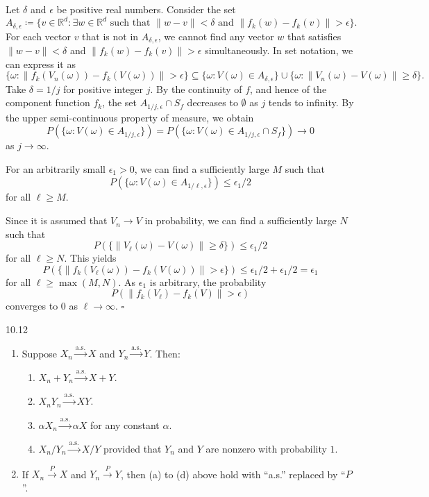 Let $\delta$ and $\epsilon$ be positive real numbers. Consider the set
\[
A_{\delta,\epsilon}\coloneqq
\{v\in\mathbb{R}^d:\exists w\in\mathbb{R}^d
\text{ such that }\lVert w-v\rVert<\delta
\text{ and }
\lVert f_k(w)-f_k(v)\rVert>\epsilon\}.
\]
For each vector $v$ that is not in $A_{\delta,\epsilon}$, we cannot find any vector $w$ that satisfies $\lVert w-v\rVert<\delta$ and $\lVert f_k(w)-f_k(v)\rVert>\epsilon$ simultaneously. In set notation, we can express it as
\[
\{\omega:\lVert f_k(V_n(\omega))-f_k(V(\omega))\rVert>\epsilon\}
\subseteq
\{\omega:V(\omega)\in A_{\delta,\epsilon}\}
\cup
\{\omega:\lVert V_n(\omega)-V(\omega)\rVert\geq\delta\}.
\]
Take $\delta=1/j$ for positive integer $j$. By the continuity of $f$, and hence of the component function $f_k$, the set $A_{1/j,\epsilon}\cap S_f$ decreases to $\emptyset$ as $j$ tends to infinity. By the upper semi-continuous property of measure, we obtain
\[
P(\{\omega:V(\omega)\in A_{1/j,\epsilon}\})
=
P(\{\omega:V(\omega)\in A_{1/j,\epsilon}\cap S_f\})
\to 0
\]
as $j\to\infty$.

For an arbitrarily small $\epsilon_1>0$, we can find a sufficiently large $M$ such that
\[
P(\{\omega:V(\omega)\in A_{1/\ell,\epsilon}\})\leq \epsilon_1/2
\]
for all $\ell\geq M$.

Since it is assumed that $V_n\to V$ in probability, we can find a sufficiently large $N$ such that
\[
P(\{\lVert V_\ell(\omega)-V(\omega)\rVert\geq\delta\})\leq \epsilon_1/2
\]
for all $\ell\geq N$. This yields
\[
P(\{\lVert f_k(V_\ell(\omega))-f_k(V(\omega))\rVert>\epsilon\})
\leq \epsilon_1/2+\epsilon_1/2=\epsilon_1
\]
for all $\ell\geq \max(M,N)$. As $\epsilon_1$ is arbitrary, the probability
\[
P(\lVert f_k(V_\ell)-f_k(V)\rVert>\epsilon)
\]
converges to $0$ as $\ell\to\infty$.
\hfill $\square$

\begin{thmbox}{10.12}
\begin{enumerate}
\item Suppose $X_n\xrightarrow{\mathrm{a.s.}}X$ and $Y_n\xrightarrow{\mathrm{a.s.}}Y$. Then:
\begin{enumerate}
\item $X_n+Y_n\xrightarrow{\mathrm{a.s.}}X+Y$.
\item $X_nY_n\xrightarrow{\mathrm{a.s.}}XY$.
\item $\alpha X_n\xrightarrow{\mathrm{a.s.}}\alpha X$ for any constant $\alpha$.
\item $X_n/Y_n\xrightarrow{\mathrm{a.s.}}X/Y$ provided that $Y_n$ and $Y$ are nonzero with probability $1$.
\end{enumerate}
\item If $X_n\xrightarrow{P}X$ and $Y_n\xrightarrow{P}Y$, then (a) to (d) above hold with ``a.s.'' replaced by ``$P$''.
\end{enumerate}
\end{thmbox}


